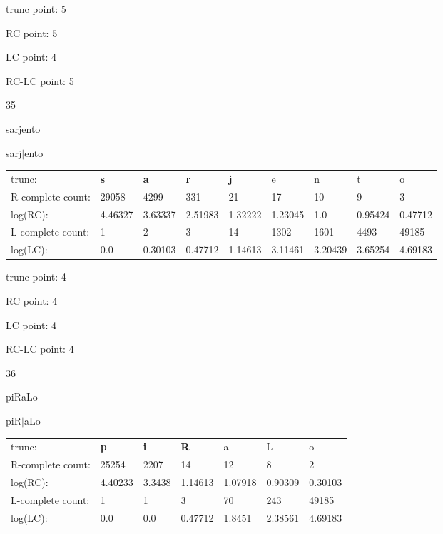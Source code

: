\documentclass{article}
\begin{document}
trunc point: 5

RC point: 5

LC point: 4

RC-LC point: 5

\vspace{3em}



35

sarjento

sarj$|$ento

\vspace{1em}

\begin{tabular}{l|llllllll}

trunc: & {\color{red}\bf s} & {\color{red}\bf a} & {\color{red}\bf r} & {\color{red}\bf j} & e & n & t & o \\ 
R-complete count: & 29058 & 4299 & 331 & 21 & 17 & 10 & 9 & 3 \\ 
log(RC): & 4.46327 & 3.63337 & 2.51983 & 1.32222 & 1.23045 & 1.0 & 0.95424 & 0.47712 \\ 
L-complete count: & 1 & 2 & 3 & 14 & 1302 & 1601 & 4493 & 49185 \\ 
log(LC): & 0.0 & 0.30103 & 0.47712 & 1.14613 & 3.11461 & 3.20439 & 3.65254 & 4.69183 \\ 
\end{tabular}

trunc point: 4

RC point: 4

LC point: 4

RC-LC point: 4

\vspace{3em}



36

piRaLo

piR$|$aLo

\vspace{1em}

\begin{tabular}{l|llllll}

trunc: & {\color{red}\bf p} & {\color{red}\bf i} & {\color{red}\bf R} & a & L & o \\ 
R-complete count: & 25254 & 2207 & 14 & 12 & 8 & 2 \\ 
log(RC): & 4.40233 & 3.3438 & 1.14613 & 1.07918 & 0.90309 & 0.30103 \\ 
L-complete count: & 1 & 1 & 3 & 70 & 243 & 49185 \\ 
log(LC): & 0.0 & 0.0 & 0.47712 & 1.8451 & 2.38561 & 4.69183 \\ 
\end{tabular}
\end{document}
